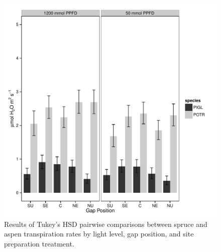 \documentclass{article}\usepackage[]{graphicx}\usepackage[]{color}
\makeatletter
\def\maxwidth{ %
  \ifdim\Gin@nat@width>\linewidth
    \linewidth
  \else
    \Gin@nat@width
  \fi
}
\newenvironment{knitrout}{}{} %
\makeatother
\begin{document}
\begin{knitrout}
\color{fgcolor}\begin{figure}[]

\includegraphics[width=\maxwidth]{figure/trmmol_plot} \caption[Results of Tukey's HSD pairwise comparisons between spruce and aspen transpiration rates by light level, gap position, and site preparation treatment]{Results of Tukey's HSD pairwise comparisons between spruce and aspen transpiration rates by light level, gap position, and site preparation treatment.\label{fig:trmmol.plot}}
\end{figure}


\end{knitrout}
\end{document}
